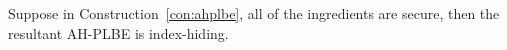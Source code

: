 \begin{theorem}\label{thm:index-hiding}
Suppose in Construction~\ref{con:ahplbe},
all of the ingredients are secure,
then the resultant AH-PLBE is index-hiding.
\end{theorem}
